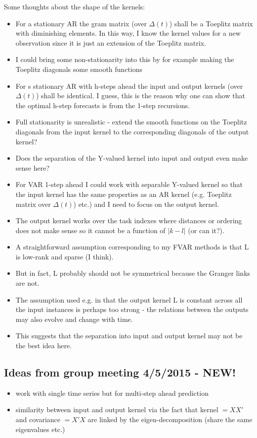 \documentclass[a4paper]{article}
\begin{document}
Some thoughts about the shape of the kernels:
\begin{itemize}
\item For a stationary AR the gram matrix (over $\Delta(t)$) shall be a Toeplitz matrix with diminishing elements. In this way, I know the kernel values for a new observation since it is just an extension of the Toeplitz matrix.
\item I could bring some non-stationarity into this by for example making the Toeplitz diagonals some smooth functions
\item For s stationary AR with h-steps ahead the input and output kernels (over $\Delta(t)$) shall be identical. I guess, this is the reason why one can show that the optimal h-step forecasts is from the 1-step recursions.
\item Full stationarity is unrealistic - extend the smooth functions on the Toeplitz diagonals from the input kernel to the corresponding diagonals of the output kernel?
\item Does the separation of the Y-valued kernel into input and output even make sense here?
\item For VAR 1-step ahead I could work with separable Y-valued kernel so that the input kernel has the same properties as an AR kernel (e.g. Toeplitz matrix over $\Delta(t)$) etc.) and I need to focus on the output kernel.
\item The output kernel works over the task indexes where distances or ordering does not make sense so it cannot be a function of $|k-l|$ (or can it?).
\item A straightforward assumption corresponding to my FVAR methods is that L is low-rank and sparse (I think). 
\item But in fact, L probably should not be symmetrical because the Granger links are not.
\item The assumption used e.g. in \cite{Dinuzzo2015} that the output kernel L is constant across all the input instances is perhaps too strong - the relations between the outputs may also evolve and change with time.
\item This suggests that the separation into input and output kernel may not be the best idea here.
\end{itemize}

\subsection{Ideas from group meeting 4/5/2015 - NEW!}
\begin{itemize}
\item work with single time series but for multi-step ahead prediction
\item similarity between input and output kernel via the fact that kernel $=X X'$ and covariance $=X' X$ are linked by the eigen-decomposition (share the same eigenvalues etc.)
\end{itemize}
\end{document}
